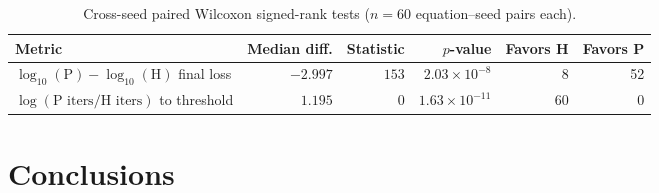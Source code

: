 \documentclass[11pt]{article}
\begin{document}
\begin{table}[H]
\centering
\caption{Cross-seed paired Wilcoxon signed-rank tests ($n=60$ equation--seed pairs each).}
\begin{tabular}{lrrrrr}
\toprule
Metric & Median diff. & Statistic & $p$-value & Favors H & Favors P \\
\midrule
$\log_{10}(\text{P}) - \log_{10}(\text{H})$ final loss & $-2.997$ & $153$ & $2.03\times10^{-8}$ & 8 & 52 \\
$\log(\text{P iters} / \text{H iters})$ to threshold & $1.195$ & $0$ & $1.63\times10^{-11}$ & 60 & 0 \\
\bottomrule
\end{tabular}
\end{table}

\FloatBarrier
\section{Conclusions}
\label{sec:conclusions}
\end{document}
